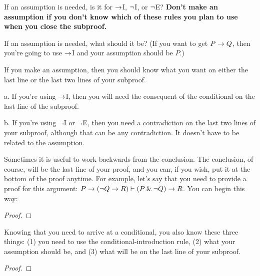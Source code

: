 \begin{earg}
\item[\ex{18-4}] If an assumption is needed, is it for $\rightarrow$I, ${\neg}$I, or ${\neg}$E? \textbf{Don't make an assumption if you don't know which of these rules you plan to use when you close the subproof.}
\medskip

\item[\ex{18-5}] If an assumption is needed, what should it be? (If you want to get $P \rightarrow Q$, then you’re going to use $\rightarrow$I and your assumption should be $P$.)
\medskip

\item[\ex{18-6}] If you make an assumption, then you should know what you want on either the last line or the last two lines of your subproof.
\begin{earg}
\item[a.] If you’re using $\rightarrow$I, then you will need the consequent of the conditional on the last line of the subproof. 
\item[b.] If you’re using ${\neg}$I or ${\neg}$E, then you need a contradiction on the last two lines of your subproof, although that can be any contradiction. It doesn't have to be related to the assumption.
\end{earg}
\medskip

\item[\ex{18-3a}] Sometimes it is useful to work backwards from the conclusion. The conclusion, of course, will be the last line of your proof, and you can, if you wish, put it at the bottom of the proof anytime. For example, let's say that you need to provide a proof for this argument: $P \rightarrow ({\neg} Q \rightarrow R) \vdash (P \mathbin{\&} {\neg} Q) \rightarrow R$. You can begin this way:
\begin{proof}
	 \pr{}
\end{proof}
\medskip

Knowing that you need to arrive at a conditional, you also know these three things: (1) you need to use the conditional-introduction rule, (2) what your assumption should be, and (3) what will be on the last line of your subproof.

\begin{proof}
	 \pr{}
	\open
		\as{}
	\close
	\ci{}
\end{proof}


\end{earg}
